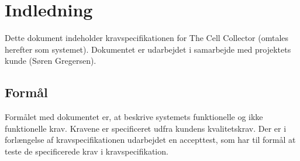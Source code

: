 \section{Indledning}
Dette dokument indeholder kravspecifikationen for The Cell Collector (omtales herefter som systemet). Dokumentet er udarbejdet i samarbejde med projektets kunde (Søren Gregersen). 
\subsection{Formål}
Formålet med dokumentet er, at beskrive systemets funktionelle og ikke funktionelle krav. Kravene er specificeret udfra kundens kvalitetskrav. Der er i forlængelse af kravspecifikationen udarbejdet en accepttest, som har til formål at teste de specificerede krav i kravspecifikation.

